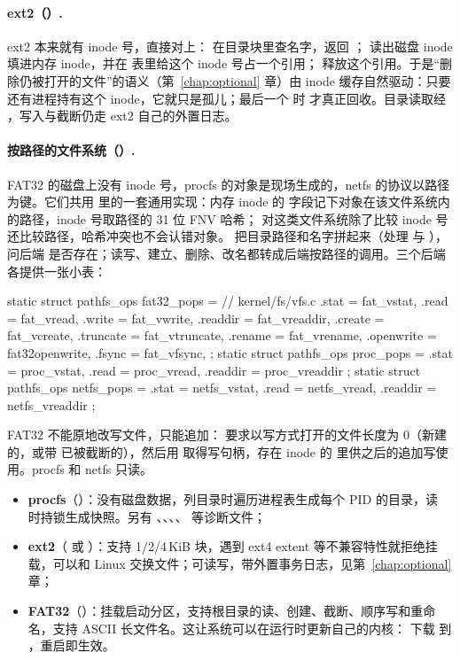 \paragraph{ext2（）.} ext2 本来就有 inode 号，直接对上： 在目录块里查名字，返回 ； 读出磁盘 inode 填进内存 inode，并在  表里给这个 inode 号占一个引用； 释放这个引用。于是“删除仍被打开的文件”的语义（第~\ref{chap:optional} 章）由 inode 缓存自然驱动：只要还有进程持有这个 inode，它就只是孤儿；最后一个  时  才真正回收。目录读取经 ，写入与截断仍走 ext2 自己的外置日志。

\paragraph{按路径的文件系统（）.} FAT32 的磁盘上没有 inode 号，procfs 的对象是现场生成的，netfs 的协议以路径为键。它们共用  里的一套通用实现：内存 inode 的  字段记下对象在该文件系统内的路径，inode 号取路径的 31 位 FNV 哈希； 对这类文件系统除了比较 inode 号还比较路径，哈希冲突也不会认错对象。 把目录路径和名字拼起来（处理  与 ），问后端  是否存在；读写、建立、删除、改名都转成后端按路径的调用。三个后端各提供一张小表：

\begin{ccode}
static struct pathfs_ops fat32_pops = {      // kernel/fs/vfs.c
  .stat = fat_vstat, .read = fat_vread, .write = fat_vwrite,
  .readdir = fat_vreaddir, .create = fat_vcreate, .truncate = fat_vtruncate,
  .rename = fat_vrename, .openwrite = fat32openwrite, .fsync = fat_vfsync,
};
static struct pathfs_ops proc_pops  = { .stat = proc_vstat,  .read = proc_vread,  .readdir = proc_vreaddir };
static struct pathfs_ops netfs_pops = { .stat = netfs_vstat, .read = netfs_vread, .readdir = netfs_vreaddir };
\end{ccode}

FAT32 不能原地改写文件，只能追加： 要求以写方式打开的文件长度为 0（新建的，或带  已被截断的），然后用  取得写句柄，存在 inode 的  里供之后的追加写使用。procfs 和 netfs 只读。

\begin{itemize}
  \item \textbf{procfs}（）：没有磁盘数据，列目录时遍历进程表生成每个 PID 的目录，读  时持锁生成快照。另有 、、、、 等诊断文件；
  \item \textbf{ext2}（ 或 \code{/}）：支持 1/2/4\,KiB 块，遇到 ext4 extent 等不兼容特性就拒绝挂载，可以和 Linux 交换文件；可读写，带外置事务日志，见第~\ref{chap:optional} 章；
  \item \textbf{FAT32}（）：挂载启动分区，支持根目录的读、创建、截断、顺序写和重命名，支持 ASCII 长文件名。这让系统可以在运行时更新自己的内核： 下载  到 ，重启即生效。
\end{itemize}

